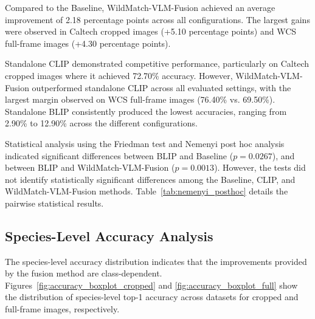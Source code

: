 Compared to the Baseline, WildMatch-VLM-Fusion achieved an average improvement of 2.18 percentage points across all configurations. The largest gains were observed in Caltech cropped images (+5.10 percentage points) and WCS full-frame images (+4.30 percentage points).

Standalone CLIP demonstrated competitive performance, particularly on Caltech cropped images where it achieved 72.70\% accuracy. However, WildMatch-VLM-Fusion outperformed standalone CLIP across all evaluated settings, with the largest margin observed on WCS full-frame images (76.40\% vs. 69.50\%). Standalone BLIP consistently produced the lowest accuracies, ranging from 2.90\% to 12.90\% across the different configurations.

Statistical analysis using the Friedman test and Nemenyi post hoc analysis indicated significant differences between BLIP and Baseline ($p = 0.0267$), and between BLIP and WildMatch-VLM-Fusion ($p = 0.0013$). However, the tests did not identify statistically significant differences among the Baseline, CLIP, and WildMatch-VLM-Fusion methods. Table~\ref{tab:nemenyi_posthoc} details the pairwise statistical results.

\begin{table}[!t]
\centering
\small
\caption{Nemenyi post hoc pairwise $p$-values after the Friedman test. Values below $0.05$ indicate statistically significant differences.}
\label{tab:nemenyi_posthoc}

\end{table}

\subsection{Species-Level Accuracy Analysis}
The species-level accuracy distribution indicates that the improvements provided by the fusion method are class-dependent. Figures~\ref{fig:accuracy_boxplot_cropped} and \ref{fig:accuracy_boxplot_full} show the distribution of species-level top-1 accuracy across datasets for cropped and full-frame images, respectively.

